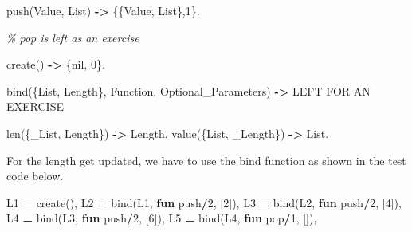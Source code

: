 \documentclass[
]{book}
\newenvironment{Shaded}{\begin{snugshade}}{\end{snugshade}}
\newcommand{\CharTok}[1]{\textcolor[rgb]{0.31,0.60,0.02}{#1}}
\newcommand{\CommentTok}[1]{\textcolor[rgb]{0.56,0.35,0.01}{\textit{#1}}}
\newcommand{\DecValTok}[1]{\textcolor[rgb]{0.00,0.00,0.81}{#1}}
\newcommand{\FunctionTok}[1]{\textcolor[rgb]{0.00,0.00,0.00}{#1}}
\newcommand{\KeywordTok}[1]{\textcolor[rgb]{0.13,0.29,0.53}{\textbf{#1}}}
\newcommand{\OperatorTok}[1]{\textcolor[rgb]{0.81,0.36,0.00}{\textbf{#1}}}
\newcommand{\VariableTok}[1]{\textcolor[rgb]{0.00,0.00,0.00}{#1}}
\begin{document}
\begin{Shaded}
\begin{Highlighting}[]
\FunctionTok{push(}\VariableTok{Value}\FunctionTok{,} \VariableTok{List}\FunctionTok{)} \OperatorTok{{-}\textgreater{}} \FunctionTok{\{\{}\VariableTok{Value}\FunctionTok{,} \VariableTok{List}\FunctionTok{\},}\DecValTok{1}\FunctionTok{\}.}

\CommentTok{\% pop is left as an exercise}
   
\FunctionTok{create()} \OperatorTok{{-}\textgreater{}} \FunctionTok{\{}\CharTok{nil}\FunctionTok{,} \DecValTok{0}\FunctionTok{\}.}

\FunctionTok{bind(\{}\VariableTok{List}\FunctionTok{,} \VariableTok{Length}\FunctionTok{\},} \VariableTok{Function}\FunctionTok{,} \VariableTok{Optional\_Parameters}\FunctionTok{)} \OperatorTok{{-}\textgreater{}} 
    \VariableTok{LEFT} \VariableTok{FOR} \VariableTok{AN} \VariableTok{EXERCISE}

\FunctionTok{len(\{}\VariableTok{\_List}\FunctionTok{,} \VariableTok{Length}\FunctionTok{\})} \OperatorTok{{-}\textgreater{}} \VariableTok{Length}\FunctionTok{.}
\FunctionTok{value(\{}\VariableTok{List}\FunctionTok{,} \VariableTok{\_Length}\FunctionTok{\})} \OperatorTok{{-}\textgreater{}} \VariableTok{List}\FunctionTok{.}
\end{Highlighting}
\end{Shaded}

For the length get updated, we have to use the bind function as shown in the test code below.

\begin{Shaded}
\begin{Highlighting}[]
\VariableTok{L1} \OperatorTok{=} \FunctionTok{create(),}
\VariableTok{L2} \OperatorTok{=} \FunctionTok{bind(}\VariableTok{L1}\FunctionTok{,} \KeywordTok{fun} \CharTok{push}\OperatorTok{/}\DecValTok{2}\FunctionTok{,} \FunctionTok{[}\DecValTok{2}\FunctionTok{]),}
\VariableTok{L3} \OperatorTok{=} \FunctionTok{bind(}\VariableTok{L2}\FunctionTok{,} \KeywordTok{fun} \CharTok{push}\OperatorTok{/}\DecValTok{2}\FunctionTok{,} \FunctionTok{[}\DecValTok{4}\FunctionTok{]),}
\VariableTok{L4} \OperatorTok{=} \FunctionTok{bind(}\VariableTok{L3}\FunctionTok{,} \KeywordTok{fun} \CharTok{push}\OperatorTok{/}\DecValTok{2}\FunctionTok{,} \FunctionTok{[}\DecValTok{6}\FunctionTok{]),}
\VariableTok{L5} \OperatorTok{=} \FunctionTok{bind(}\VariableTok{L4}\FunctionTok{,} \KeywordTok{fun} \CharTok{pop}\OperatorTok{/}\DecValTok{1}\FunctionTok{,} \FunctionTok{[]),}
\end{Highlighting}
\end{Shaded}
\end{document}
